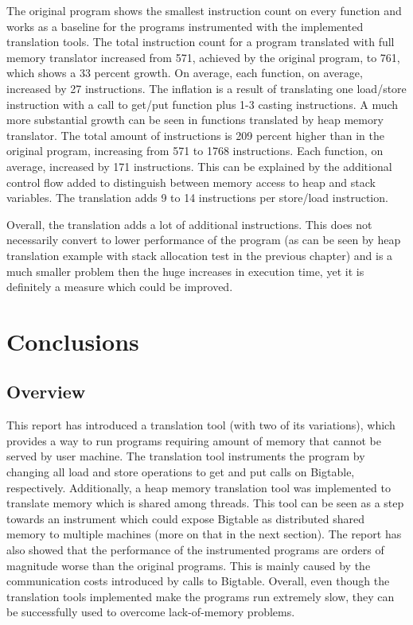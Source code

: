 \documentclass[bsc,frontabs,twoside,singlespacing,parskip,deptreport]{infthesis}     %
\begin{document}
The original program shows the smallest instruction count on every function and works as a baseline for the programs instrumented with the implemented translation tools. The total instruction count for a program translated with full memory translator increased from 571, achieved by the original program, to 761, which shows a 33 percent growth. On average, each function, on average, increased by 27 instructions. The inflation is a result of translating one load/store instruction with a call to get/put function plus 1-3 casting instructions. A much more substantial growth can be seen in functions translated by heap memory translator. The total amount of instructions is 209 percent higher than in the original program, increasing from 571 to 1768 instructions. Each function, on average, increased by 171 instructions. This can be explained by the additional control flow added to distinguish between memory access to heap and stack variables. The translation adds 9 to 14 instructions per store/load instruction.

Overall, the translation adds a lot of additional instructions. This does not necessarily convert to lower performance of the program (as can be seen by heap translation example with stack allocation test in the previous chapter) and is a much smaller problem then the huge increases in execution time, yet it is definitely a measure which could be improved.

\chapter{Conclusions}

\section{Overview}

This report has introduced a translation tool (with two of its variations), which provides a way to run programs requiring amount of memory that cannot be served by user machine. The translation tool instruments the program by changing all load and store operations to get and put calls on Bigtable, respectively. Additionally, a heap memory translation tool was implemented to translate memory which is shared among threads. This tool can be seen as a step towards an instrument which could expose Bigtable as distributed shared memory to multiple machines (more on that in the next section). The report has also showed that the performance of the instrumented programs are orders of magnitude worse than the original programs. This is mainly caused by the communication costs introduced by calls to Bigtable. Overall, even though the translation tools implemented make the programs run extremely slow, they can be successfully used to overcome lack-of-memory problems.
\end{document}
